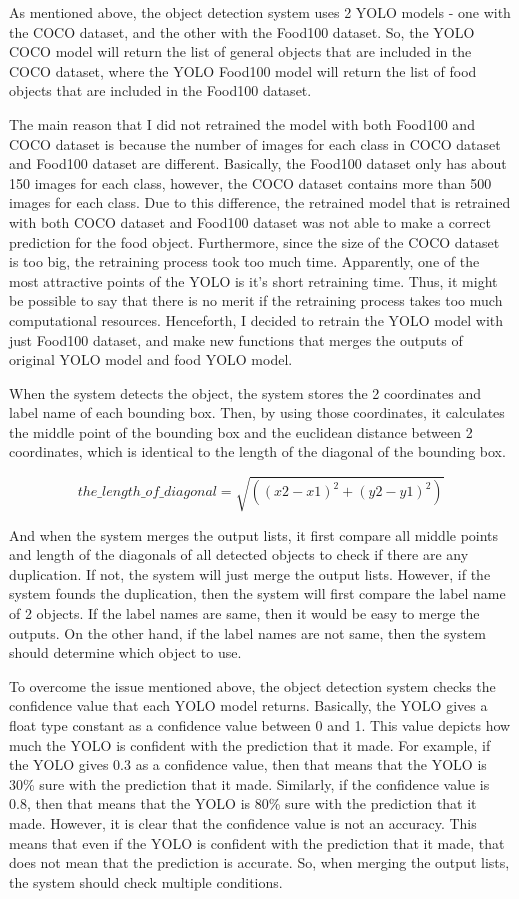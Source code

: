 \documentclass{article}
\begin{document}
As mentioned above, the object detection system uses 2 YOLO models - one with the COCO dataset, and the other with the Food100 dataset. So, the YOLO COCO model will return the list of general objects that are included in the COCO dataset, where the YOLO Food100 model will return the list of food objects that are included in the Food100 dataset.

The main reason that I did not retrained the model with both Food100 and COCO dataset is because the number of images for each class in COCO dataset and Food100 dataset are different. Basically, the Food100 dataset only has about 150 images for each class, however, the COCO dataset contains more than 500 images for each class. Due to this difference, the retrained model that is retrained with both COCO dataset and Food100 dataset was not able to make a correct prediction for the food object. Furthermore, since the size of the COCO dataset is too big, the retraining process took too much time. Apparently, one of the most attractive points of the YOLO is it's short retraining time. Thus, it might be possible to say that there is no merit if the retraining process takes too much computational resources. Henceforth, I decided to retrain the YOLO model with just Food100 dataset, and make new functions that merges the outputs of original YOLO model and food YOLO model.

When the system detects the object, the system stores the 2 coordinates and label name of each bounding box. Then, by using those coordinates, it calculates the middle point of the bounding box and the euclidean distance between 2 coordinates, which is identical to the length of the diagonal of the bounding box. 

\[the\_length\_of\_diagonal = \sqrt{((x2 - x1)^{2} + (y2 - y1)^{2})}\]

And when the system merges the output lists, it first compare all middle points and length of the diagonals of all detected objects to check if there are any duplication. If not, the system will just merge the output lists. However, if the system founds the duplication, then the system will first compare the label name of 2 objects. If the label names are same, then it would be easy to merge the outputs. On the other hand, if the label names are not same, then the system should determine which object to use.

To overcome the issue mentioned above, the object detection system checks the confidence value that each YOLO model returns. Basically, the YOLO gives a float type constant as a confidence value between 0 and 1. This value depicts how much the YOLO is confident with the prediction that it made. For example, if the YOLO gives 0.3 as a confidence value, then that means that the YOLO is 30\% sure with the prediction that it made. Similarly, if the confidence value is 0.8, then that means that the YOLO is 80\% sure with the prediction that it made. However, it is clear that the confidence value is not an accuracy. This means that even if the YOLO is confident with the prediction that it made, that does not mean that the prediction is accurate. So, when merging the output lists, the system should check multiple conditions.
\end{document}
